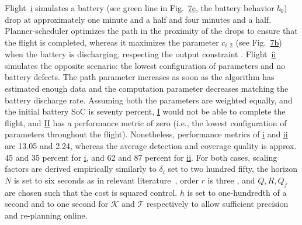 \documentclass[letterpaper,10pt,journal,twoside]{IEEEtran}
\theoremstyle{definition}
\begin{document}
Flight~\hyperref[fig:ener-dyn-i]{i} simulates a battery ({\color{blue}see} green line {\color{blue}in Fig.~\hyperref[fig:dyn]{7c}}, the battery behavior $b_0$) drop at approximately one minute and a half and four minutes and a half. Planner-scheduler optimizes the path in the proximity of the drops to ensure that the flight is completed, whereas it maximizes the parameter $c_{i,2}$ {\color{blue}(see Fig.~\hyperref[fig:dyn]{7b})} when the battery is discharging, respecting the output constraint%
. Flight~\hyperref[fig:ener-dyn-ii]{ii} simulates the opposite scenario: the lowest configuration of parameters and no battery defects. The path parameter increases as soon as the algorithm has estimated enough data %
and the computation parameter decreases matching the battery discharge rate. 
{\color{blue}
Assuming both the parameters are weighted equally, and the initial battery SoC is seventy percent, \hyperref[fig:trajs-I-static]{I} would not be able to complete the flight, and \hyperref[fig:trajs-II-static]{II} has a performance metric of zero (i.e., the lowest configuration of parameters throughout the flight).
Nonetheless, performance metrics of \hyperref[fig:trajs-dyn-i]{i} and \hyperref[fig:trajs-dyn-ii]{ii} are 13.05 and 2.24, whereas the average detection and coverage quality is approx. 45 and 35 percent for \hyperref[fig:trajs-dyn-i]{i}, and 62 and 87 percent for \hyperref[fig:trajs-dyn-ii]{ii}.}
For both cases, scaling factors are derived empirically %
{\color{blue}similarly to $\delta_i$ set to two hundred fifty}, 
the horizon $N$ is set to six seconds {\color{blue} as in} relevant literature~\cite{gavilan2015iterative,%
stastny2018nonlinear%
}, order $r$ is three%
, and %
$Q,R,Q_f$ are chosen such that the cost is %
squared control. {\color{blue} $h$ is set to one-hundredth of a second and to one second for $\mathcal{K}$ and $\mathcal{T}$ respectively to allow sufficient precision and re-planning online.}
\end{document}
